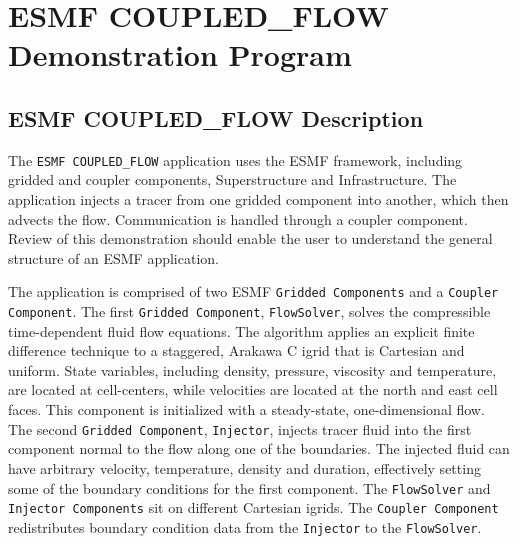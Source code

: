 
\section{ESMF COUPLED\_FLOW Demonstration Program}
\label{sec:demo}

\subsection{ESMF COUPLED\_FLOW Description}

The {\tt ESMF COUPLED\_FLOW} application uses the ESMF framework, including 
gridded and coupler components, Superstructure and Infrastructure. 
The application injects a tracer from one gridded
component into another, which then advects the flow.  Communication is handled through a
coupler component.  Review of this demonstration should enable the user to
understand the general structure of an ESMF application.

 
The application is comprised of two ESMF 
{\tt Gridded Components} and a {\tt Coupler Component}.  
The first {\tt Gridded Component}, {\tt FlowSolver}, solves the compressible 
time-dependent fluid flow equations.  The algorithm 
applies an explicit finite difference technique to a staggered, Arakawa C igrid 
that is Cartesian and uniform.  State variables, including density, 
pressure, viscosity and temperature, are located at cell-centers, while 
velocities are located at the north and east cell faces.  This component is initialized 
with a steady-state, one-dimensional flow.  The second {\tt Gridded 
Component}, {\tt Injector}, injects tracer fluid into the first component normal to the 
flow along 
one of the boundaries.  The injected fluid can have arbitrary velocity, 
temperature, density and duration, effectively setting some of 
the boundary conditions for the first component.  The {\tt FlowSolver} and 
{\tt Injector Components} sit on different Cartesian igrids.  The
{\tt Coupler Component} redistributes boundary condition data from 
the {\tt Injector} to the {\tt FlowSolver}.

